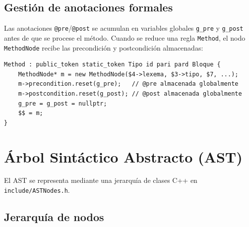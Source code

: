 \subsection{Gesti\'on de anotaciones formales}

Las anotaciones \texttt{@pre}/\texttt{@post} se acumulan en variables globales
\texttt{g\_pre} y \texttt{g\_post} antes de que se procese el m\'etodo. Cuando
se reduce una regla \texttt{Method}, el nodo \texttt{MethodNode} recibe las
precondici\'on y postcondici\'on almacenadas:

\begin{lstlisting}[style=cpp, caption={Vinculaci\'on de anotaciones al MethodNode}]
Method : public_token static_token Tipo id pari pard Bloque {
    MethodNode* m = new MethodNode($4->lexema, $3->tipo, $7, ...);
    m->precondition.reset(g_pre);   // @pre almacenada globalmente
    m->postcondition.reset(g_post); // @post almacenada globalmente
    g_pre = g_post = nullptr;
    $$ = m;
}
\end{lstlisting}

\section{\'Arbol Sint\'actico Abstracto (AST)}

El AST se representa mediante una jerarqu\'ia de clases C++ en
\texttt{include/ASTNodes.h}.

\subsection{Jerarqu\'ia de nodos}


